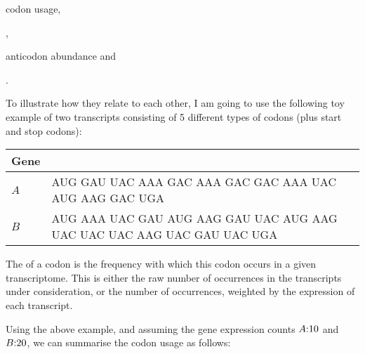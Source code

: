 \begin{shortenumerate}
    \item codon usage,
    \item \rcu,
    \item anticodon abundance and
    \item \raa.
\end{shortenumerate}

To illustrate how they relate to each other, I am going to use the following toy
example of two transcripts consisting of \num{5} different types of codons (plus
start and stop codons):

\begin{table}[H]
    \centering
    \begin{tabu} to 
        \toprule
        Gene &  \\
        \midrule
        \(A\) & AUG GAU UAC AAA GAC AAA GAC GAC AAA UAC AUG AAG GAC UGA \\
        \(B\) & AUG AAA UAC GAU AUG AAG GAU UAC AUG AAG UAC UAC UAC AAG UAC GAU UAC UGA \\
        \bottomrule
    \end{tabu}
\end{table}

The  of a codon is the frequency with which this codon
occurs in a given transcriptome. This is either the raw number of occurrences in
the transcripts under consideration, or the number of occurrences, weighted by
the expression of each transcript.

Using the above example, and assuming the gene expression counts \(A\text: 10\)
and \(B\text: 20\), we can summarise the codon usage as follows:

